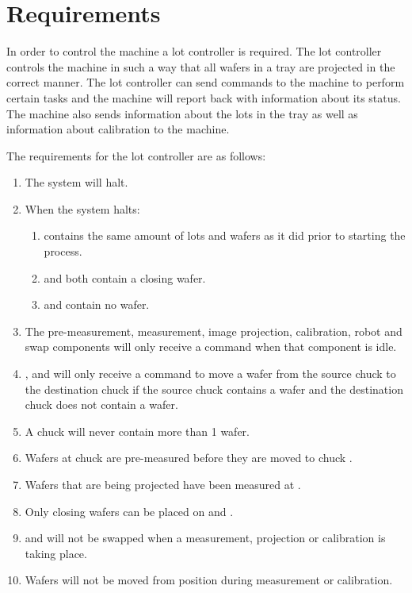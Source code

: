 \section{Requirements}\label{sec:requirements}
In order to control the machine a lot controller is required.
The lot controller controls the machine in such a way that all wafers in a tray are projected in the correct manner.
The lot controller can send commands to the machine to perform certain tasks and the machine will report back with information about its status.
The machine also sends information about the lots in the tray as well as information about calibration to the machine. 

The requirements for the lot controller are as follows:
\begin{enumerate}
    \item The system will halt.
    \item When the system halts:
        \begin{enumerate}
            \item \tray contains the same amount of lots and wafers as it did prior to starting the process.
            \item \chuckMeas and \chuckProj both contain a closing wafer.
            \item \chuckIn and \chuckOut contain no wafer.
        \end{enumerate}
    \item The pre-measurement, measurement, image projection, calibration, robot and swap components will only receive a command when that component is idle.
    \item \robotOne, \robotTwo and \robotThree will only receive a command to move a wafer from the source chuck to the destination chuck if the source chuck contains a wafer and the destination chuck does not contain a wafer.
    \item A chuck will never contain more than 1 wafer.
    \item Wafers at chuck \chuckIn are pre-measured before they are moved to chuck \chuckMeas.
    \item Wafers that are being projected have been measured at \chuckMeas.
    \item Only closing wafers can be placed on \chuckEmptyOne and \chuckEmptyTwo.
    \item \chuckMeas and \chuckProj will not be swapped when a measurement, projection or calibration is taking place.
    \item Wafers will not be moved from \chuckMeas position during measurement or calibration.

\end{enumerate}
